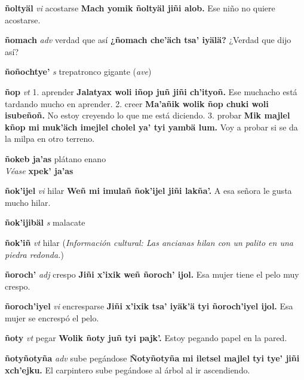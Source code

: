 \documentclass[10pt]{scrbook}
\newcommand{\entry}[1]{\textbf{#1}}
\newcommand{\onedefinition}[1]{#1.}
\newcommand{\partofspeech}[1]{\textit{#1}}
\newcommand{\spanishtranslation}[1]{#1}
\newcommand{\clarification}[1]{(\textit{#1})}
\newcommand{\cholexample}[1]{\textbf{#1}}
\newcommand{\exampletranslation}[1]{#1}
\newcommand{\alsosee}[1]{\\\textit{Véase} \textbf{#1}}
\newcommand{\culturalinformation}[1]{(\textit{#1})}
\begin{document}
\begin{multicols}{2}
\entry{ñoltyäl}
\partofspeech{vi}
\spanishtranslation{acostarse}
\cholexample{Mach yomik ñoltyäl jiñi alob.}
\exampletranslation{Ese niño no quiere acostarse.}

\entry{ñomach}
\partofspeech{adv}
\spanishtranslation{verdad que así}
\cholexample{¿ñomach che'äch tsa' iyälä?}
\exampletranslation{¿Verdad que dijo así?}

\entry{ñoñochtye'}
\partofspeech{s}
\spanishtranslation{trepatronco gigante}
\clarification{ave}

\entry{ñop}
\partofspeech{vt}
\onedefinition{1}
\spanishtranslation{aprender}
\cholexample{Jalatyax woli iñop juñ jiñi ch'ityoñ.}
\exampletranslation{Ese muchacho está tardando mucho en aprender.}
\onedefinition{2}
\spanishtranslation{creer}
\cholexample{Ma'añik wolik ñop chuki woli isubeñoñ.}
\exampletranslation{No estoy creyendo lo que me está diciendo.}
\onedefinition{3}
\spanishtranslation{probar}
\cholexample{Mik majlel kñop mi muk'äch imejlel cholel ya' tyi yambä lum.}
\exampletranslation{Voy a probar si se da la milpa en otro terreno.}

\entry{ñokeb ja'as}
\spanishtranslation{plátano enano}
\alsosee{xpek' ja'as}

\entry{ñok'ijel}
\partofspeech{vi}
\spanishtranslation{hilar}
\cholexample{Weñ mi imulañ ñok'ijel jiñi lakña'.}
\exampletranslation{A esa señora le gusta mucho hilar.}

\entry{ñok'ijibäl}
\partofspeech{s}
\spanishtranslation{malacate}

\entry{ñok'iñ}
\partofspeech{vt}
\spanishtranslation{hilar}
\culturalinformation{Información cultural: Las ancianas hilan con un palito en una piedra redonda.}

\entry{ñoroch'}
\partofspeech{adj}
\spanishtranslation{crespo}
\cholexample{Jiñi x'ixik weñ ñoroch' ijol.}
\exampletranslation{Esa mujer tiene el pelo muy crespo.}

\entry{ñoroch'iyel}
\partofspeech{vi}
\spanishtranslation{encresparse}
\cholexample{Jiñi x'ixik tsa' iyäk'ä tyi ñoroch'iyel ijol.}
\exampletranslation{Esa mujer se encrespó el pelo.}

\entry{ñoty}
\partofspeech{vt}
\spanishtranslation{pegar}
\cholexample{Wolik ñoty juñ tyi pajk'.}
\exampletranslation{Estoy pegando papel en la pared.}

\entry{ñotyñotyña}
\partofspeech{adv}
\spanishtranslation{sube pegándose}
\cholexample{Ñotyñotyña mi iletsel majlel tyi tye' jiñi xch'ejku.}
\exampletranslation{El carpintero sube pegándose al árbol al ir ascendiendo.}


\end{multicols}
\end{document}
